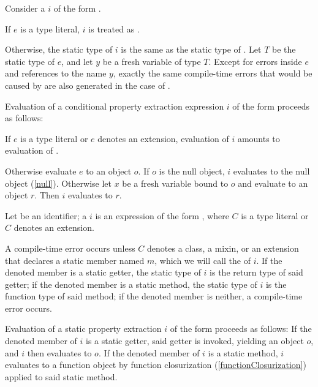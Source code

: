 \documentclass[makeidx]{article}
\begin{document}
{\LMHash{}%
Consider a 
$i$ of the form .

\LMHash{}%
If $e$ is a type literal, $i$ is treated as .

\LMHash{}%
Otherwise, the static type of $i$ is the same as
the static type of .
Let $T$ be the static type of $e$,
and let $y$ be a fresh variable of type $T$.
Except for errors inside $e$ and references to the name $y$,
exactly the same compile-time errors that would be caused by 
are also generated in the case of .

\LMHash{}%
Evaluation of a conditional property extraction expression $i$
of the form  proceeds as follows:

\LMHash{}%
If $e$ is a type literal or $e$ denotes an extension,
evaluation of $i$ amounts to evaluation of .

\LMHash{}%
Otherwise evaluate $e$ to an object $o$.
If $o$ is the null object, $i$ evaluates to the null object (\ref{null}).
Otherwise let $x$ be a fresh variable bound to $o$
and evaluate  to an object $r$.
Then $i$ evaluates to $r$.
\EndCase

\LMHash{}%
Let \id{} be an identifier;
a 
$i$ is an expression of the form ,
where $C$ is a type literal or $C$ denotes an extension.

\LMHash{}%
A compile-time error occurs
unless $C$ denotes a class, a mixin, or an extension that declares
a static member named $m$,
which we will call the
of $i$.
If the denoted member is a static getter,
the static type of $i$ is the return type of said getter;
if the denoted member is a static method,
the static type of $i$ is the function type of said method;
if the denoted member is neither, a compile-time error occurs.

\LMHash{}%
Evaluation of a static property extraction $i$ of the form 
proceeds as follows:
If the denoted member of $i$ is a static getter,
said getter is invoked, yielding an object $o$,
and $i$ then evaluates to $o$.
If the denoted member of $i$ is a static method,
$i$ evaluates to a function object by function closurization
(\ref{functionClosurization})
applied to said static method.
\EndCase

}
\end{document}
